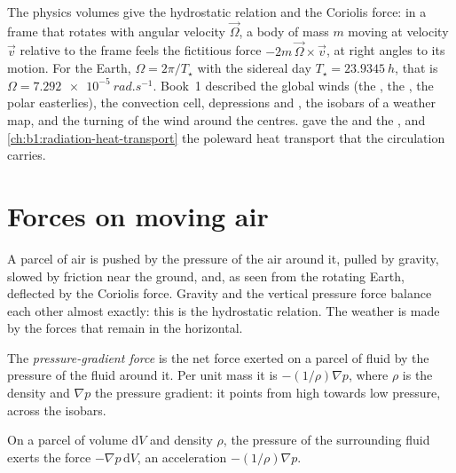 \begin{recall}
The physics volumes give the hydrostatic relation and the Coriolis force: in a
frame that rotates with angular velocity $\vec\Omega$, a body of mass $m$ moving
at velocity $\vec v$ relative to the frame feels the fictitious force
$-2m\,\vec\Omega\times\vec v$, at right angles to its motion. For the Earth,
$\Omega = 2\pi/T_\star$ with the sidereal day $T_\star = \qty{23.9345}{h}$, that is
$\Omega = \qty{7.292e-5}{rad.s^{-1}}$. Book~1 described the global winds (the , the , the polar easterlies), the convection cell, depressions and
, the isobars of a weather map, and the turning of the wind around the
centres.  gave the  and the
, and \cref{ch:b1:radiation-heat-transport} the poleward
heat transport that the circulation carries.
\end{recall}

\section{Forces on moving air}\label{sec:b1:atmospheric-circulation:forces}

A parcel of air is pushed by the pressure of the air around it, pulled by gravity,
slowed by friction near the ground, and, as seen from the rotating Earth, deflected
by the Coriolis force. Gravity and the vertical pressure force balance each other
almost exactly: this is the hydrostatic relation. The weather is made by the forces
that remain in the horizontal.

\begin{definition}\label{def:b1:atmospheric-circulation:pgf}
The \emph{pressure-gradient force} is the net force
exerted on a parcel of fluid by the pressure of the fluid around it. Per unit mass it
is $-(1/\rho)\nabla p$, where $\rho$ is the density and $\nabla p$ the pressure
gradient: it points from high towards low pressure, across the isobars.
\end{definition}

\begin{proposition}\label{prop:b1:atmospheric-circulation:pgf}
On a parcel of volume $\mathrm dV$ and density $\rho$, the pressure of the
surrounding fluid exerts the force $-\nabla p\,\mathrm dV$, an acceleration
$-(1/\rho)\nabla p$.
\end{proposition}

